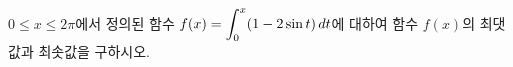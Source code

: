$0\le x\le 2\pi$에서 정의된 함수 $f(x)=\displaystyle\int_{0}^{x}(1-2\sin t)\mkern3mu dt$에 대하여 함수 $f(x)$의 최댓값과 최솟값을 구하시오.
